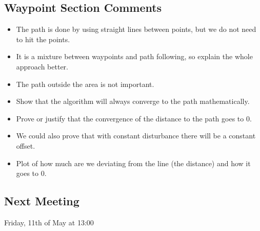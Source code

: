 \subsection{Waypoint Section Comments}
\begin{itemize}
    \item The path is done by using straight lines between points, but we do not need to hit the points.
    \item It is a mixture between waypoints and path following, so explain the whole approach better.
    \item The path outside the area is not important.
    \item Show that the algorithm will always converge to the path mathematically.
    \item Prove or justify that the convergence of the distance to the path goes to 0.
    \item We could also prove that with constant disturbance there will be a constant offset.
    \item Plot of how much are we deviating from the line (the distance) and how it goes to 0.
\end{itemize}

\subsection{Next Meeting}
Friday, 11th of May at 13:00
